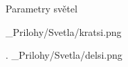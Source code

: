  Parametry světel

{
\medskip
\picw=15cm _Prilohy/Svetla/kratsi.png
}
\par { .}
{
\medskip
\picw=15cm _Prilohy/Svetla/delsi.png
}

\par